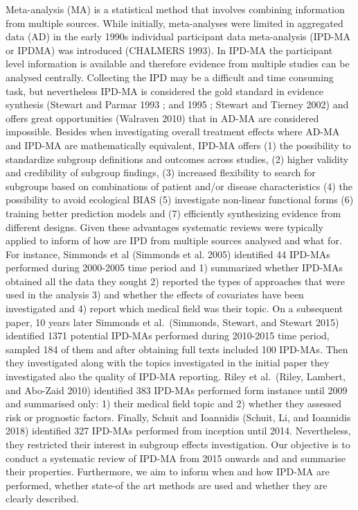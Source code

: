 \documentclass[]{article}
\begin{document}
Meta-analysis (MA) is a statistical method that involves combining
information from multiple sources. While initially, meta-analyses were
limited in aggregated data (AD) in the early 1990s individual
participant data meta-analysis (IPD-MA or IPDMA) was introduced
(CHALMERS 1993). In IPD-MA the participant level information is
available and therefore evidence from multiple studies can be analysed
centrally. Collecting the IPD may be a difficult and time consuming
task, but nevertheless IPD-MA is considered the gold standard in
evidence synthesis (Stewart and Parmar 1993 ; and 1995 ; Stewart and
Tierney 2002) and offers great opportunities (Walraven 2010) that in
AD-MA are considered impossible. Besides when investigating overall
treatment effects where AD-MA and IPD-MA are mathematically equivalent,
IPD-MA offers (1) the possibility to standardize subgroup definitions
and outcomes across studies, (2) higher validity and credibility of
subgroup findings, (3) increased flexibility to search for subgroups
based on combinations of patient and/or disease characteristics (4) the
possibility to avoid ecological BIAS (5) investigate non-linear
functional forms (6) training better prediction models and (7)
efficiently synthesizing evidence from different designs. Given these
advantages systematic reviews were typically applied to inform of how
are IPD from multiple sources analysed and what for. For instance,
Simmonds et al (Simmonds et al. 2005) identified 44 IPD-MAs performed
during 2000-2005 time period and 1) summarized whether IPD-MAs obtained
all the data they sought 2) reported the types of approaches that were
used in the analysis 3) and whether the effects of covariates have been
investigated and 4) report which medical field was their topic. On a
subsequent paper, 10 years later Simmonds et al.~(Simmonds, Stewart, and
Stewart 2015) identified 1371 potential IPD-MAs performed during
2010-2015 time period, sampled 184 of them and after obtaining full
texts included 100 IPD-MAs. Then they investigated along with the topics
investigated in the initial paper they investigated also the quality of
IPD-MA reporting. Riley et al.~(Riley, Lambert, and Abo-Zaid 2010)
identified 383 IPD-MAs performed form instance until 2009 and summarised
only: 1) their medical field topic and 2) whether they assessed risk or
prognostic factors. Finally, Schuit and Ioannidis (Schuit, Li, and
Ioannidis 2018) identified 327 IPD-MAs performed from inception until
2014. Nevertheless, they restricted their interest in subgroup effects
investigation. Our objective is to conduct a systematic review of IPD-MA
from 2015 onwards and and summarise their properties. Furthermore, we
aim to inform when and how IPD-MA are performed, whether state-of the
art methods are used and whether they are clearly described.
\end{document}
